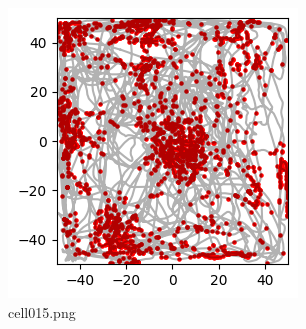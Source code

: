 \begin{figure}[ht]
	\centering
	\includegraphics[scale=0.8, max width=\linewidth]{./fig/appendix/grid-cells-decoding/cell015.png}
	\caption{cell015.png}
	\label{cell015.png}
\end{figure}